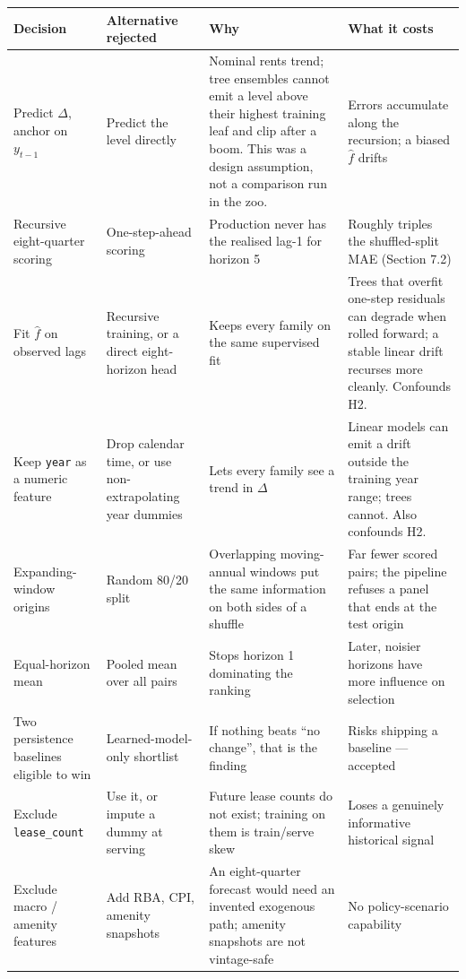 \documentclass[11pt,a4paper]{article}
\begin{document}
\begin{center}
\small
\begin{tabularx}{\linewidth}{@{}>{\raggedright\arraybackslash}X>{\raggedright\arraybackslash}X>{\raggedright\arraybackslash}X>{\raggedright\arraybackslash}X@{}}
\toprule
Decision & Alternative rejected & Why & What it costs \\
\midrule
Predict \(\Delta\), anchor on \(y_{t-1}\) & Predict the level directly & Nominal rents trend; tree ensembles cannot emit a level above their highest training leaf and clip after a boom. This was a design assumption, not a comparison run in the zoo. & Errors accumulate along the recursion; a biased \(\hat f\) drifts \\
Recursive eight-quarter scoring & One-step-ahead scoring & Production never has the realised lag-1 for horizon 5 & Roughly triples the shuffled-split MAE (Section 7.2) \\
Fit \(\hat f\) on observed lags & Recursive training, or a direct eight-horizon head & Keeps every family on the same supervised fit & Trees that overfit one-step residuals can degrade when rolled forward; a stable linear drift recurses more cleanly. Confounds H2. \\
Keep \texttt{year} as a numeric feature & Drop calendar time, or use non-extrapolating year dummies & Lets every family see a trend in \(\Delta\) & Linear models can emit a drift outside the training year range; trees cannot. Also confounds H2. \\
Expanding-window origins & Random 80/20 split & Overlapping moving-annual windows put the same information on both sides of a shuffle & Far fewer scored pairs; the pipeline refuses a panel that ends at the test origin \\
Equal-horizon mean & Pooled mean over all pairs & Stops horizon 1 dominating the ranking & Later, noisier horizons have more influence on selection \\
Two persistence baselines eligible to win & Learned-model-only shortlist & If nothing beats ``no change'', that is the finding & Risks shipping a baseline --- accepted \\
Exclude \texttt{lease\_count} & Use it, or impute a dummy at serving & Future lease counts do not exist; training on them is train/serve skew & Loses a genuinely informative historical signal \\
Exclude macro / amenity features & Add RBA, CPI, amenity snapshots & An eight-quarter forecast would need an invented exogenous path; amenity snapshots are not vintage-safe & No policy-scenario capability \\

\end{tabularx}
\end{center}
\end{document}
